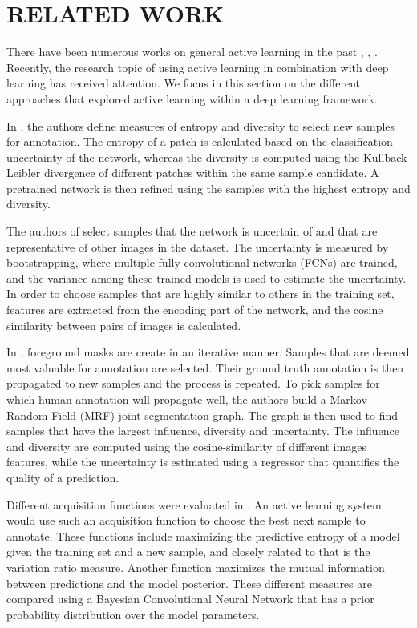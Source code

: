 \documentclass[letterpaper, 10 pt, conference]{ieeeconf}  %
\begin{document}
\section{RELATED WORK}
\label{sec:related}

There have been numerous works on general active learning in the past \cite{settles2009active}, \cite{guyon2011results}, \cite{holub2008entropy}. Recently, the research topic of using active learning in combination with deep learning has received attention. We focus in this section on the different approaches that explored active learning within a deep learning framework.

In \cite{zhou2017fine}, the authors define measures of entropy and diversity to select new samples for annotation. The entropy of a patch is calculated based on the classification uncertainty of the network, whereas the diversity is computed using the Kullback Leibler divergence of different patches within the same sample candidate. A pretrained network is then refined using the samples with the highest entropy and diversity.

The authors of \cite{yang2017suggestive} select samples that the network is uncertain of and that are representative of other images in the dataset. The uncertainty is measured by bootstrapping, where multiple fully convolutional networks (FCNs) are trained, and the variance among  these trained models is used to estimate the uncertainty. In order to choose samples that are highly similar to others in the training set, features are extracted from the encoding part of the network, and the cosine similarity between pairs of images is calculated. 

In \cite{dutt2016active}, foreground masks are create in an iterative manner. Samples that are deemed most valuable for annotation are selected. Their ground truth annotation is then propagated to new samples and the process is repeated. To pick samples for which human annotation will propagate well, the authors build a Markov Random Field (MRF) joint segmentation graph. The graph is then used to find samples that have the largest influence, diversity and uncertainty. The influence and diversity are computed using the cosine-similarity of different images features, while the uncertainty is estimated using a regressor that quantifies the quality of a prediction. 

Different acquisition functions were evaluated in \cite{gal2017deep}. An active learning system would use such an acquisition function to choose the best next sample to annotate. These functions include maximizing the predictive entropy of a model given the training set and a new sample, and closely related to that is the variation ratio measure. Another function maximizes the mutual information between predictions and the model posterior. These different measures are compared using a Bayesian Convolutional Neural Network that has a prior probability distribution over the model parameters.  
\end{document}
